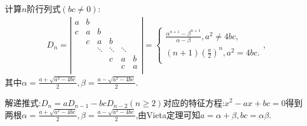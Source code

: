 \documentclass[../../main.tex]{subfiles}%
\begin{document}
\begin{corollary}[三对角矩阵的行列式]\label{corollary:对角线元素相同的三对角行列式}
计算$n$阶行列式$(bc\ne0)$:
\begin{equation}
\begin{split}
D_n=\left| \begin{matrix}
a&		b&		&		&		&		\\
c&		a&		b&		&		&		\\
&		c&		a&		b&		&		\\
&		&		\ddots&		\ddots&		\ddots&		\\
&		&		&		c&		a&		b\\
&		&		&		&		c&		a\\
\end{matrix} \right|=\begin{cases}
\frac{\alpha ^{n+1}-\beta ^{n+1}}{\alpha -\beta},a^2\ne 4bc,\\
\left( n+1 \right) \left( \frac{a}{2} \right) ^n,a^2=4bc.\\
\end{cases},
\end{split}
\nonumber
\end{equation}
其中$\alpha =\frac{a+\sqrt{a^2-4bc}}{2},\beta =\frac{a-\sqrt{a^2-4bc}}{2}$.
\end{corollary}
\begin{note}
解递推式:$D_n=aD_{n-1}-bcD_{n-2}(n\ge2)$对应的特征方程:$x^2-ax+bc=0$得到两根$\alpha =\frac{a+\sqrt{a^2-4bc}}{2},\beta =\frac{a-\sqrt{a^2-4bc}}{2}$,由Vieta定理可知$a=\alpha+\beta,bc=\alpha\beta$.
\end{note}
\end{document}
